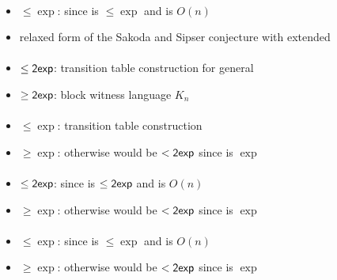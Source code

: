 \paragraph{\TNFA{}\tto\OMODLA}
\begin{itemize}
	\item $\le\exp$: since \hyperref[cost:2NFAto1DFA]{\TNFA{}\tto\ODFA} is $\le\exp$ and \ODFA{}\tto\OMODLA is $O(n)$
	\item relaxed form of the Sakoda and Sipser conjecture with extended \TDFA
\end{itemize}
\paragraph{\OMOLA{}\tto\ODFA}\label{cost:OM1LAto1DFA}
\begin{itemize}
	\item $\le\mathsf{2exp}$: transition table construction for general \OLA \cite{PigPis14}
	\item $\ge\mathsf{2exp}$: block witness language $K_n$ \cite{PigPri23a}
\end{itemize}
\paragraph{\OMOLA{}\tto\ONFA}\label{cost:OM1LAto1NFA}
\begin{itemize}
	\item $\le\exp$: transition table construction \cite{PigPis14}
	\item $\ge\exp$: otherwise \hyperref[cost:OM1LAto1DFA]{\OMOLA{}\tto\ODFA} would be $<\mathsf{2exp}$ since \hyperref[cost:1NFAto1DFA]{\ONFA{}\tto\ODFA} is $\exp$
\end{itemize}
\paragraph{\OMOLA{}\tto\TDFA}
\begin{itemize}
	\item $\le\mathsf{2exp}$: since \hyperref[cost:OM1LAto1DFA]{\OMOLA{}\tto\ODFA} is $\le\mathsf{2exp}$ and \ODFA{}\tto\TDFA is $O(n)$
	\item $\ge\exp$: otherwise \hyperref[cost:OM1LAto1DFA]{\OMOLA{}\tto\ODFA} would be $<\mathsf{2exp}$ since \hyperref[cost:2DFAto1DFA]{\TDFA{}\tto\ODFA} is $\exp$
\end{itemize}
\paragraph{\OMOLA{}\tto\TNFA}
\begin{itemize}
	\item $\le\exp$: since \hyperref[cost:OM1LAto1NFA]{\OMOLA{}\tto\ONFA} is $\le\exp$ and \ONFA{}\tto\TNFA is $O(n)$
	\item $\ge\exp$: otherwise \hyperref[cost:OM1LAto1DFA]{\OMOLA{}\tto\ODFA} would be $<\mathsf{2exp}$ since \hyperref[cost:2NFAto1DFA]{\TNFA{}\tto\ODFA} is $\exp$
\end{itemize}
